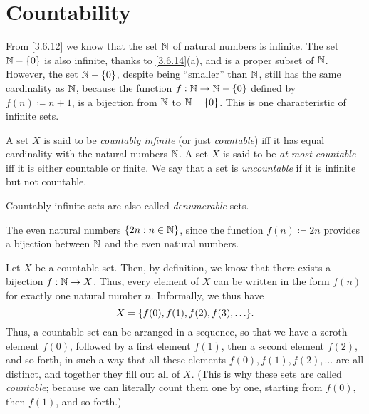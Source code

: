 \section{Countability}\label{sec:8.1}

\begin{note}
	From \cref{3.6.12} we know that the set \(\mathbb{N}\) of natural numbers is infinite.
	The set \(\mathbb{N} - \left\lbrace0\right\rbrace\) is also infinite, thanks to \cref{3.6.14}(a), and is a proper subset of \(\mathbb{N}\).
	However, the set \(\mathbb{N} - \left\lbrace0\right\rbrace\), despite being ``smaller'' than \(\mathbb{N}\), still has the same cardinality as \(\mathbb{N}\), because the function \(f : \mathbb{N} \to \mathbb{N} - \left\lbrace0\right\rbrace\) defined by \(f(n) \coloneqq n + 1\), is a bijection from \(\mathbb{N}\) to \(\mathbb{N} - \left\lbrace0\right\rbrace\).
	This is one characteristic of infinite sets.
\end{note}

\begin{defn}\label{8.1.1}
	A set \(X\) is said to be \emph{countably infinite} (or just \emph{countable}) iff it has equal cardinality with the natural numbers \(\mathbb{N}\).
	A set \(X\) is said to be \emph{at most countable} iff it is either countable or finite.
	We say that a set is \emph{uncountable} if it is infinite but not countable.
\end{defn}

\begin{rmk}\label{8.1.2}
	Countably infinite sets are also called \emph{denumerable} sets.
\end{rmk}

\begin{eg}\label{8.1.3}
	The even natural numbers \(\left\lbrace2n : n \in \mathbb{N}\right\rbrace\), since the function \(f(n) \coloneqq 2n\) provides a bijection between \(\mathbb{N}\) and the even natural numbers.
\end{eg}

\begin{note}
	Let \(X\) be a countable set.
	Then, by definition, we know that there exists a bijection \(f : \mathbb{N} \to X\).
	Thus, every element of \(X\) can be written in the form \(f(n)\) for exactly one natural number \(n\).
	Informally, we thus have
	\[
		X = \set{f(0), f(1), f(2), f(3), \dots}.
	\]
	Thus, a countable set can be arranged in a sequence, so that we have a zeroth element \(f(0)\), followed by a first element \(f(1)\), then a second element \(f(2)\), and so forth, in such a way that all these elements \(f(0), f(1), f(2), \dots\) are all distinct, and together they fill out all of \(X\).
	(This is why these sets are called \emph{countable};
	because we can literally count them one by one, starting from \(f(0)\), then \(f(1)\), and so forth.)
\end{note}

